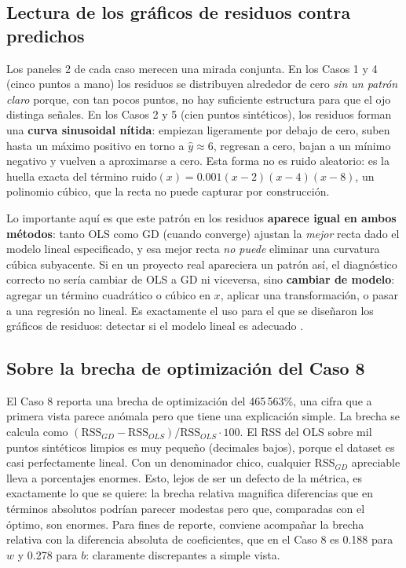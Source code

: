 \documentclass[11pt,a4paper]{article}
\begin{document}
\subsection{Lectura de los gráficos de residuos contra predichos}

Los paneles 2 de cada caso merecen una mirada conjunta. En los Casos 1 y 4 (cinco puntos a mano) los residuos se distribuyen alrededor de cero \textit{sin un patrón claro} porque, con tan pocos puntos, no hay suficiente estructura para que el ojo distinga señales. En los Casos 2 y 5 (cien puntos sintéticos), los residuos forman una \textbf{curva sinusoidal nítida}: empiezan ligeramente por debajo de cero, suben hasta un máximo positivo en torno a $\hat{y} \approx 6$, regresan a cero, bajan a un mínimo negativo y vuelven a aproximarse a cero. Esta forma no es ruido aleatorio: es la huella exacta del término $\mathrm{ruido}(x) = 0.001(x-2)(x-4)(x-8)$, un polinomio cúbico, que la recta no puede capturar por construcción.

Lo importante aquí es que este patrón en los residuos \textbf{aparece igual en ambos métodos}: tanto OLS como GD (cuando converge) ajustan la \textit{mejor} recta dado el modelo lineal especificado, y esa mejor recta \textit{no puede} eliminar una curvatura cúbica subyacente. Si en un proyecto real apareciera un patrón así, el diagnóstico correcto no sería cambiar de OLS a GD ni viceversa, sino \textbf{cambiar de modelo}: agregar un término cuadrático o cúbico en $x$, aplicar una transformación, o pasar a una regresión no lineal. Es exactamente el uso para el que se diseñaron los gráficos de residuos: detectar si el modelo lineal es adecuado \cite{fastercapital_residuos,maxima_residuos,hernandez_diag}.

\subsection{Sobre la brecha de optimización del Caso 8}

El Caso 8 reporta una brecha de optimización del 465\,563\%, una cifra que a primera vista parece anómala pero que tiene una explicación simple. La brecha se calcula como $(\mathrm{RSS}_{GD} - \mathrm{RSS}_{OLS}) / \mathrm{RSS}_{OLS} \cdot 100$. El RSS del OLS sobre mil puntos sintéticos limpios es muy pequeño (decimales bajos), porque el dataset es casi perfectamente lineal. Con un denominador chico, cualquier RSS$_{GD}$ apreciable lleva a porcentajes enormes. Esto, lejos de ser un defecto de la métrica, es exactamente lo que se quiere: la brecha relativa magnifica diferencias que en términos absolutos podrían parecer modestas pero que, comparadas con el óptimo, son enormes. Para fines de reporte, conviene acompañar la brecha relativa con la diferencia absoluta de coeficientes, que en el Caso 8 es 0.188 para $w$ y 0.278 para $b$: claramente discrepantes a simple vista.
\end{document}
